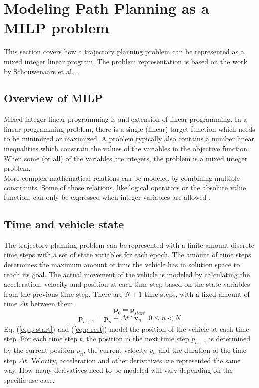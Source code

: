\section{Modeling Path Planning as a MILP problem}
This section covers how a trajectory planning problem can be represented as a mixed integer linear program. The problem representation is based on the work by Schouwenaars et al. \cite{Schouwenaars2001}.
\subsection{Overview of MILP}
\label{subsec:previous}
Mixed integer linear programming is and extension of linear programming. In a linear programming problem, there is a single (linear) target function which needs to be minimized or maximized. A problem typically also contains a number linear inequalities which constrain the values of the variables in the objective function. When some (or all) of the variables are integers, the problem is a mixed integer problem. \\
More complex mathematical relations can be modeled by combining multiple constraints. Some of those relations, like logical operators or the absolute value function, can only be expressed when integer variables are allowed \cite{Mitra1994}.
\subsection{Time and vehicle state}
\label{section:modeling}
The trajectory planning problem can be represented with a finite amount discrete time steps with a set of state variables for each epoch. The amount of time steps determines the maximum amount of time the vehicle has in solution space to reach its goal. The actual movement of the vehicle is modeled by calculating the acceleration, velocity and position at each time step based on the state variables from the previous time step. There are $N + 1$ time steps, with a fixed amount of time $\Delta t$ between them.
\begin{equation}
\label{eq:p-start}
\boldsymbol{p}_0 = \boldsymbol{p}_{start}
\end{equation}
\begin{equation}
\label{eq:p-rest}
\boldsymbol{p}_{n+1} = \boldsymbol{p}_{n} + \Delta t * \boldsymbol{v}_{n}  \quad 0 \leq n < N
\end{equation}
Eq. (\ref{eq:p-start}) and (\ref{eq:p-rest}) model the position of the vehicle at each time step. For each time step $t$, the position in the next time step $p_{n+1}$ is determined by the current position $p_n$, the current velocity $v_n$ and the duration of the time step $\Delta t$. Velocity, acceleration and other derivatives are represented the same way. How many derivatives need to be modeled will vary depending on the specific use case.
